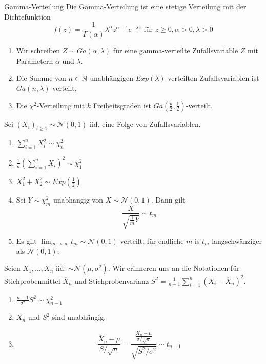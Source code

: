 \begin{subbox}{Gamma-Verteilung}
	Die Gamma-Verteilung ist eine stetige Verteilung mit der Dichtefunktion
	\[f(z) = \frac{1}{\Gamma(\alpha)}\lambda^{\alpha}z^{\alpha-1}e^{-\lambda z} \text{ für } z \geq 0, \alpha >0, \lambda > 0\]
	\begin{enumerate}
		\item Wir schreiben $Z \sim Ga(\alpha, \lambda)$ für eine gamma-verteilte Zufallsvariable $Z$ mit Parametern $\alpha$ und $\lambda$.
		\item Die Summe von $n \in \mathbb{N}$ unabhängigen $Exp(\lambda)$-verteilten Zufallsvariablen ist $Ga(n, \lambda)$-verteilt.
		\item Die $\chi^2$-Verteilung mit $k$ Freiheitsgraden ist $Ga\left(\frac{k}{2}, \frac{1}{2}\right)$-verteilt. 
	\end{enumerate}
\end{subbox}
Sei $(X_i)_{i \geq 1} \sim \mathcal{N}(0,1)$ iid. eine Folge von Zufallsvariablen. 
\begin{enumerate}
	\item $\sum_{i = 1}^{n} X_i^2 \sim \chi^2_n$
	\item $\frac{1}{n}(\sum_{i = 1}^n X_i)^2 \sim \chi_1^2$
	\item $X_1^2 + X_2^2 \sim Exp\left(\frac{1}{2}\right)$
	\item Sei $Y \sim \chi_m^2$ unabhängig von $X \sim \mathcal{N}(0,1)$. Dann gilt \[\frac{X}{\sqrt{\frac{1}{m}Y}} \sim t_m\] 
	\item Es gilt $\lim_{m\to\infty} t_m \sim \mathcal{N}(0,1)$ verteilt, für endliche $m$ is $t_m$ langschwänziger als $\mathcal{N}(0,1).$
\end{enumerate}
Seien $X_1, \ldots, X_n$ iid. $\sim \mathcal{N}(\mu, \sigma^2)$.
Wir erinneren uns an die Notationen für Stichprobenmittel $\overline{X}_n$ und Stichprobenvarianz $S^2 = \frac{1}{n-1}\sum_{i = 1}^n(X_i - \overline{X}_n)^2$.
\begin{enumerate}
	\item $\frac{n-1}{\sigma^2}S^2 \sim \chi_{n-1}^2$
	\item $\overline{X}_n$ und $S^2$ sind unabhängig.
	\item \[\frac{\overline{X}_n - \mu}{S/\sqrt{n}} = \frac{\frac{\overline{X}_n - \mu}{\sigma / \sqrt{n}}}{\sqrt{S^2/\sigma^2}} \sim t_{n-1}\]
\end{enumerate}

